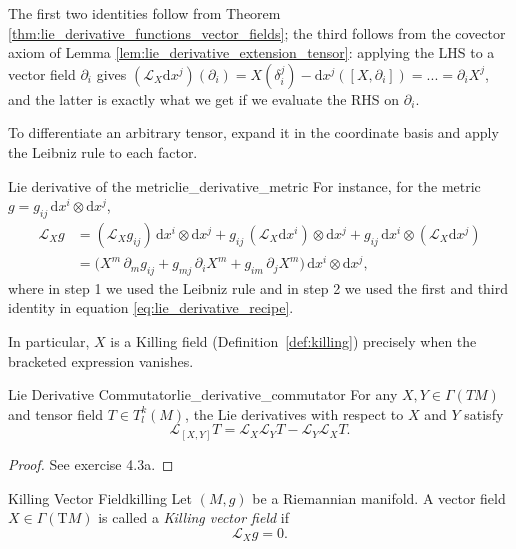 The first two identities follow from Theorem \ref{thm:lie_derivative_functions_vector_fields}; the third follows from the covector axiom of Lemma \ref{lem:lie_derivative_extension_tensor}: applying the LHS to a vector field $\partial_i$ gives $(\mathcal{L}_X \mathrm{d}x^j)(\partial_i) = X(\delta^j_i) - \mathrm{d}x^j([X,\partial_i]) =...= \partial_i X^j$, and the latter is exactly what we get if we evaluate the RHS on $\partial_i$.

To differentiate an arbitrary tensor, expand it in the coordinate basis and apply the Leibniz rule to each factor.



\begin{colexample}{Lie derivative of the metric}{lie_derivative_metric}
    For instance, for the metric $g = g_{ij}\,\mathrm{d}x^i \otimes \mathrm{d}x^j$,
    \begin{align*}
    \mathcal{L}_X g
    &= (\mathcal{L}_X g_{ij})\,\mathrm{d}x^i\otimes \mathrm{d}x^j
     + g_{ij}\,(\mathcal{L}_X \mathrm{d}x^i)\otimes \mathrm{d}x^j
     + g_{ij}\,\mathrm{d}x^i\otimes(\mathcal{L}_X \mathrm{d}x^j) \\
    &= \big(X^m\,\partial_m g_{ij} + g_{mj}\,\partial_i X^m + g_{im}\,\partial_j X^m\big)\,\mathrm{d}x^i\otimes \mathrm{d}x^j ,
    \end{align*}
    where in step 1 we used the Leibniz rule and in step 2 we used the first and third identity in equation \eqref{eq:lie_derivative_recipe}.
\end{colexample}


In particular, $X$ is a Killing field (Definition~\ref{def:killing}) precisely when the bracketed expression vanishes.



\begin{colorlem}{Lie Derivative Commutator}{lie_derivative_commutator}
For any $X, Y \in \Gamma(TM)$ and tensor field $T \in T^k_l(M)$, the Lie derivatives with respect to $X$ and $Y$ satisfy
\[
\mathcal{L}_{[X,Y]} T=\mathcal{L}_X \mathcal{L}_Y T - \mathcal{L}_Y \mathcal{L}_X T.
\]
\end{colorlem}

\begin{proof}
See exercise 4.3a.
\end{proof}




\begin{colordef}{Killing Vector Field}{killing}
Let $(M,g)$ be a Riemannian manifold. A vector field $X \in \Gamma(\mathrm{T}M)$ is called a \emph{Killing vector field} if
\[
\mathcal{L}_X g = 0.
\]
\end{colordef}

